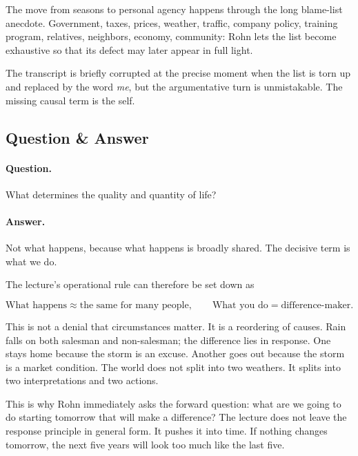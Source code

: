 The move from seasons to personal agency happens through the long blame-list anecdote. Government, taxes, prices, weather, traffic, company policy, training program, relatives, neighbors, economy, community: Rohn lets the list become exhaustive so that its defect may later appear in full light.

\begin{remark}
The transcript is briefly corrupted at the precise moment when the list is torn up and replaced by the word \emph{me}, but the argumentative turn is unmistakable. The missing causal term is the self.
\end{remark}

\subsection{Question \& Answer}

\paragraph{Question.} What determines the quality and quantity of life?

\paragraph{Answer.} Not what happens, because what happens is broadly shared. The decisive term is what we do.

The lecture's operational rule can therefore be set down as

\begin{equation}
\text{What happens} \approx \text{the same for many people}, \qquad \text{What you do}=\text{difference-maker}.
\end{equation}

This is not a denial that circumstances matter. It is a reordering of causes. Rain falls on both salesman and non-salesman; the difference lies in response. One stays home because the storm is an excuse. Another goes out because the storm is a market condition. The world does not split into two weathers. It splits into two interpretations and two actions.

This is why Rohn immediately asks the forward question: what are we going to do starting tomorrow that will make a difference? The lecture does not leave the response principle in general form. It pushes it into time. If nothing changes tomorrow, the next five years will look too much like the last five.

